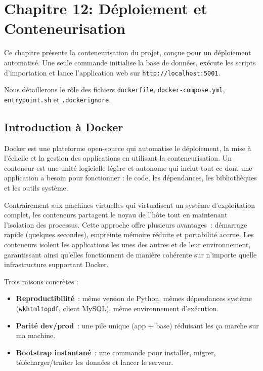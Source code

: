 \chapter{Chapitre 12: Déploiement et Conteneurisation}
\label{chap:deploiement}

Ce chapitre présente la conteneurisation du projet, conçue pour un déploiement automatisé. Une seule commande initialise la base de données, exécute les scripts d'importation et lance l'application web sur \texttt{http://localhost:5001}.

Nous détaillerons le rôle des fichiers \texttt{dockerfile}, \texttt{docker-compose.yml}, \texttt{entrypoint.sh} et \texttt{.dockerignore}.

\section{Introduction à Docker}
Docker est une plateforme open-source qui automatise le déploiement, la mise à l'échelle et la gestion des applications en utilisant la conteneurisation. Un conteneur est une unité logicielle légère et autonome qui inclut tout ce dont une application a besoin pour fonctionner : le code, les dépendances, les bibliothèques et les outils système. 

Contrairement aux machines virtuelles qui virtualisent un système d'exploitation complet, les conteneurs partagent le noyau de l'hôte tout en maintenant l'isolation des processus. Cette approche offre plusieurs avantages : démarrage rapide (quelques secondes), empreinte mémoire réduite et portabilité accrue. Les conteneurs isolent les applications les unes des autres et de leur environnement, garantissant ainsi qu'elles fonctionnent de manière cohérente sur n'importe quelle infrastructure supportant Docker.


Trois raisons concrètes :
\begin{itemize}
  \item \textbf{Reproductibilité} : même version de Python, mêmes dépendances système (\texttt{wkhtmltopdf}, client MySQL), même environnement d'exécution.
  \item \textbf{Parité dev/prod} : une pile unique (app + base) réduisant les \og ça marche sur ma machine\fg{}.
  \item \textbf{Bootstrap instantané} : une commande pour installer, migrer, télécharger/traiter les données et lancer le serveur.
\end{itemize}

